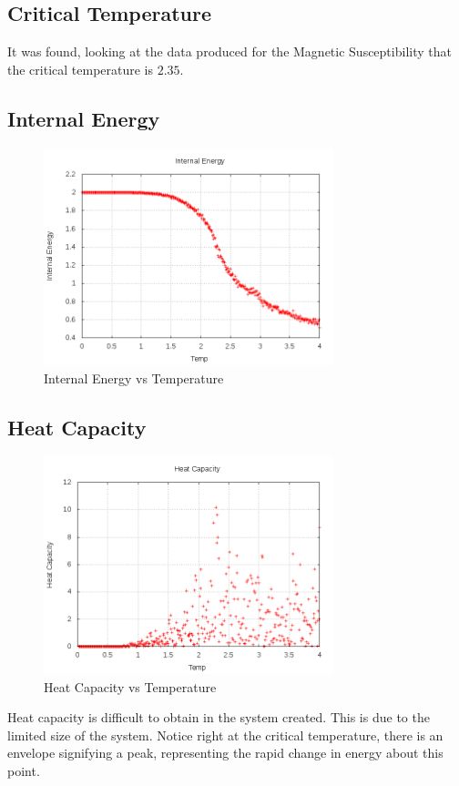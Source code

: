 \documentclass[letterpaper,12pt]{article}
\numberwithin{equation}{subsection}
\begin{document}
\subsection{Critical Temperature}
It was found, looking at the data produced for the Magnetic Susceptibility that the critical temperature is $2.35$.
\subsection{Internal Energy}
\begin{figure}[H]
        \centering
        \caption{Internal Energy vs Temperature \label{fig:EvsT}}
                \centering
                \includegraphics[width=0.75\textwidth]{EVsT.png}
\end{figure}
\subsection{Heat Capacity}
\begin{figure}[H]
        \centering
        \caption{Heat Capacity vs Temperature \label{fig:CvsT}}
                \centering
                \includegraphics[width=0.75\textwidth]{C_vVsT.png}
\end{figure}
Heat capacity is difficult to obtain in the system created. This is due to the limited size of the system. Notice right at the critical temperature, there is an envelope signifying a peak, representing the rapid change in energy about this point.
\end{document}
